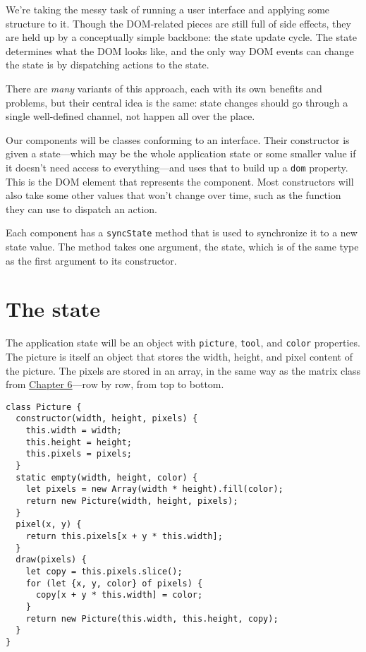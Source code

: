 We're taking the messy task of running a user interface and applying some structure to it. Though the DOM-related pieces are still full of side effects, they are held up by a conceptually simple backbone: the state update cycle. The state determines what the DOM looks like, and the only way DOM events can change the state is by dispatching actions to the state.

There are \emph{many} variants of this approach, each with its own benefits and problems, but their central idea is the same: state changes should go through a single well-defined channel, not happen all over the place.

Our components will be classes conforming to an interface. Their constructor is given a state—which may be the whole application state or some smaller value if it doesn't need access to everything—and uses that to build up a \lstinline`dom` property. This is the DOM element that represents the component. Most constructors will also take some other values that won't change over time, such as the function they can use to dispatch an action.

Each component has a \lstinline`syncState` method that is used to synchronize it to a new state value. The method takes one argument, the state, which is of the same type as the first argument to its constructor.

\section{The state}

The application state will be an object with \lstinline`picture`, \lstinline`tool`, and \lstinline`color` properties. The picture is itself an object that stores the width, height, and pixel content of the picture. The pixels are stored in an array, in the same way as the matrix class from \hyperref[object]{Chapter 6}—row by row, from top to bottom.

\begin{lstlisting}
class Picture {
  constructor(width, height, pixels) {
    this.width = width;
    this.height = height;
    this.pixels = pixels;
  }
  static empty(width, height, color) {
    let pixels = new Array(width * height).fill(color);
    return new Picture(width, height, pixels);
  }
  pixel(x, y) {
    return this.pixels[x + y * this.width];
  }
  draw(pixels) {
    let copy = this.pixels.slice();
    for (let {x, y, color} of pixels) {
      copy[x + y * this.width] = color;
    }
    return new Picture(this.width, this.height, copy);
  }
}
\end{lstlisting}
\noindent{}

